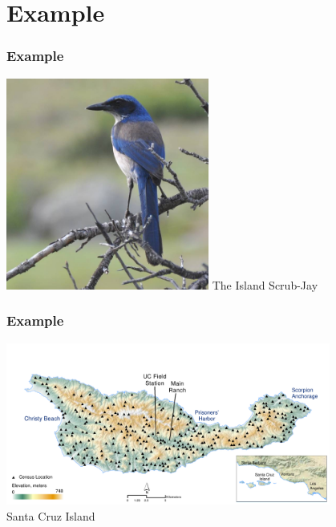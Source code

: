 \documentclass[color=usenames,dvipsnames]{beamer}\usepackage[]{graphicx}\usepackage[]{color}
\begin{document}









\section{Example}



\begin{frame}[plain]
  \frametitle{Example}
  \Huge
  \begin{center}
    \includegraphics[width=0.5\textwidth]{figs/issj}
    The Island Scrub-Jay
  \end{center}
\end{frame}



\begin{frame}[plain]
  \frametitle{Example}
  \Huge
  \begin{center}
    \includegraphics[width=0.8\textwidth]{figs/Santa-Cruz} \\
    Santa Cruz Island
  \end{center}
\end{frame}
\end{document}
